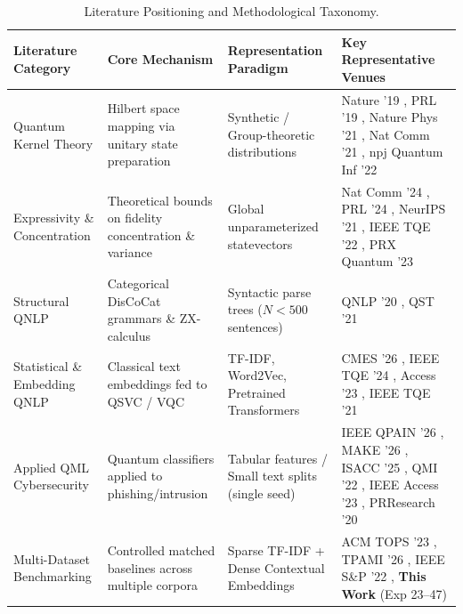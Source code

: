 \documentclass{article}
\begin{document}
\begin{table}[!htbp]
\centering
\small
\caption{Literature Positioning and Methodological Taxonomy.}
\label{tab:lit_taxonomy}
\setlength{\tabcolsep}{4pt}
\begin{tabularx}{\textwidth}{p{3.2cm}p{3.5cm}p{3.2cm}X}
\toprule
Literature Category & Core Mechanism & Representation Paradigm & Key Representative Venues \\
\midrule
Quantum Kernel Theory & Hilbert space mapping via unitary state preparation & Synthetic / Group-theoretic distributions & Nature '19 \cite{havlicek2019supervised}, PRL '19 \cite{schuld2019quantum}, Nature Phys '21 \cite{liu2021rigorous}, Nat Comm '21 \cite{huang2021power}, npj Quantum Inf '22 \cite{glick2022covariant} \\
\midrule
Expressivity \& Concentration & Theoretical bounds on fidelity concentration \& variance & Global unparameterized statevectors & Nat Comm '24 \cite{thanasilp2024exponential}, PRL '24 \cite{bowles2024contextuality}, NeurIPS '21 \cite{kubler2021inductive}, IEEE TQE '22 \cite{shaydulin2022importance}, PRX Quantum '23 \cite{meyer2023exploiting} \\
\midrule
Structural QNLP & Categorical DisCoCat grammars \& ZX-calculus & Syntactic parse trees ($N < 500$ sentences) & QNLP '20 \cite{coecke2020mathematics}, QST '21 \cite{lorenz2021qnlp} \\
\midrule
Statistical \& Embedding QNLP & Classical text embeddings fed to QSVC / VQC & TF-IDF, Word2Vec, Pretrained Transformers & CMES '26 \cite{rahevar2026quantum}, IEEE TQE '24 \cite{garg2024quantum}, Access '23 \cite{shukla2023quantum}, IEEE TQE '21 \cite{disipio2021hybrid} \\
\midrule
Applied QML Cybersecurity & Quantum classifiers applied to phishing/intrusion & Tabular features / Small text splits (single seed) & IEEE QPAIN '26 \cite{hridi2026batch}, MAKE '26 \cite{ammar2026quantum}, ISACC '25 \cite{shahriyar2025phishvqc}, QMI '22 \cite{sagingalieva2022quantum}, IEEE Access '23 \cite{alsarem2023phishing}, PRResearch '20 \cite{lu2020quantum} \\
\midrule
Multi-Dataset Benchmarking & Controlled matched baselines across multiple corpora & Sparse TF-IDF + Dense Contextual Embeddings & ACM TOPS '23 \cite{alsallami2023empirical}, TPAMI '26 \cite{li2026large}, IEEE S\&P '22 \cite{ren2022generating}, \textbf{This Work} (Exp 23–47) \\
\bottomrule
\end{tabularx}
\end{table}
\end{document}
